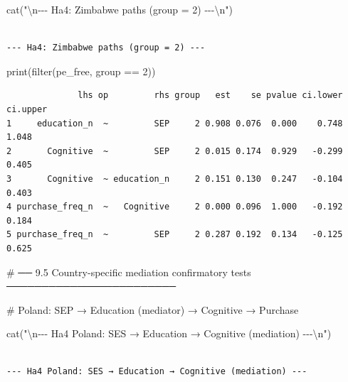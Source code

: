 \documentclass[
  letterpaper,
  DIV=11,
  numbers=noendperiod]{scrartcl}
\newenvironment{Shaded}{\begin{snugshade}}{\end{snugshade}}
\newcommand{\CommentTok}[1]{\textcolor[rgb]{0.37,0.37,0.37}{#1}}
\newcommand{\DecValTok}[1]{\textcolor[rgb]{0.68,0.00,0.00}{#1}}
\newcommand{\FunctionTok}[1]{\textcolor[rgb]{0.28,0.35,0.67}{#1}}
\newcommand{\NormalTok}[1]{\textcolor[rgb]{0.00,0.23,0.31}{#1}}
\newcommand{\SpecialCharTok}[1]{\textcolor[rgb]{0.37,0.37,0.37}{#1}}
\newcommand{\StringTok}[1]{\textcolor[rgb]{0.13,0.47,0.30}{#1}}
\begin{document}
\begin{Shaded}
\begin{Highlighting}[]
\FunctionTok{cat}\NormalTok{(}\StringTok{"}\SpecialCharTok{\textbackslash{}n}\StringTok{{-}{-}{-} Ha4: Zimbabwe paths (group = 2) {-}{-}{-}}\SpecialCharTok{\textbackslash{}n}\StringTok{"}\NormalTok{)}
\end{Highlighting}
\end{Shaded}

\begin{verbatim}

--- Ha4: Zimbabwe paths (group = 2) ---
\end{verbatim}

\begin{Shaded}
\begin{Highlighting}[]
\FunctionTok{print}\NormalTok{(}\FunctionTok{filter}\NormalTok{(pe\_free, group }\SpecialCharTok{==} \DecValTok{2}\NormalTok{))}
\end{Highlighting}
\end{Shaded}

\begin{verbatim}
              lhs op         rhs group   est    se pvalue ci.lower ci.upper
1     education_n  ~         SEP     2 0.908 0.076  0.000    0.748    1.048
2       Cognitive  ~         SEP     2 0.015 0.174  0.929   -0.299    0.405
3       Cognitive  ~ education_n     2 0.151 0.130  0.247   -0.104    0.403
4 purchase_freq_n  ~   Cognitive     2 0.000 0.096  1.000   -0.192    0.184
5 purchase_freq_n  ~         SEP     2 0.287 0.192  0.134   -0.125    0.625
\end{verbatim}

\begin{Shaded}
\begin{Highlighting}[]
\CommentTok{\# ── 9.5  Country{-}specific mediation confirmatory tests ────────────────────────}

\CommentTok{\# Poland: SEP → Education (mediator) → Cognitive → Purchase}

\FunctionTok{cat}\NormalTok{(}\StringTok{"}\SpecialCharTok{\textbackslash{}n}\StringTok{{-}{-}{-} Ha4 Poland: SES → Education → Cognitive (mediation) {-}{-}{-}}\SpecialCharTok{\textbackslash{}n}\StringTok{"}\NormalTok{)}
\end{Highlighting}
\end{Shaded}

\begin{verbatim}

--- Ha4 Poland: SES → Education → Cognitive (mediation) ---
\end{verbatim}
\end{document}
